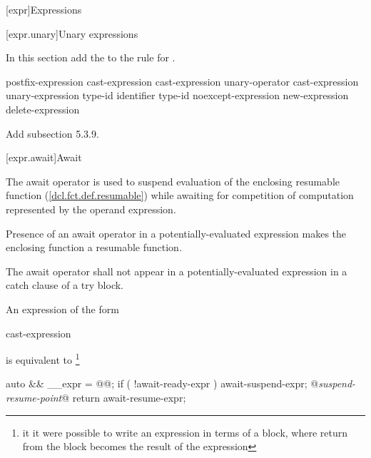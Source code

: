 

\setcounter{chapter}{4}
[expr]{Expressions}

\setcounter{section}{2}
[expr.unary]{Unary expressions}

In this section add the   
to the rule for .

\begin{bnf}
	\br
	postfix-expression\br
	\terminal{++} cast-expression\br
	\terminal{-{-}} cast-expression\br
	\br
	unary-operator cast-expression\br
	 unary-expression\br
	 type-id \terminal{)}\br
	 \terminal{(} identifier \terminal{)}\br
	 type-id \terminal{)}\br
	noexcept-expression\br
	new-expression\br
	delete-expression\br
\end{bnf}

Add subsection 5.3.9.

\setcounter{subsection}{8}
[expr.await]{Await}

\pnum
The await operator is used to suspend evaluation of the enclosing resumable function (\ref{dcl.fct.def.resumable}) while awaiting
for competition of computation represented by the operand expression.

\pnum
Presence of an await operator in a potentially-evaluated expression makes the enclosing function a resumable function.

\pnum
The await operator shall not appear in a potentially-evaluated expression in a catch clause of a try block.


\pnum
An  expression of the form

\begin{ncbnf}
	 cast-expression
\end{ncbnf}

is equivalent to \footnote{it it were possible to write
an expression in terms of a block, where return from the 
block becomes the result of the expression}

\begin{codeblock}
{
  auto && __expr = @@;
  if ( !await-ready-expr ) {
    await-suspend-expr;
    @\textit{suspend-resume-point}@
  }
  return await-resume-expr;
}
\end{codeblock}

